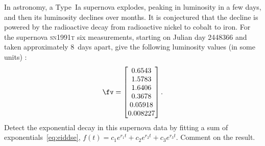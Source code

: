 \begin{exercise}  
In astronomy, a Type~Ia supernova explodes, peaking in luminosity in a few days, and then its luminosity declines over months. 
It is conjectured that the decline is powered by the radioactive decay from radioactive nickel to cobalt to iron.
For the supernova \textsc{sn1991t} six measurements, starting on Julian day 2448366 and taken approximately 8~days apart, give the following luminosity values (in some units) \cite[p.146]{Pereyra2010}:
\setbox\ajrqrbox\hbox{}\marginajrbox%
\begin{equation*}
\fv=\begin{bmatrix} 0.6543
\\ 1.5783
\\ 1.6406
\\ 0.3678
\\ 0.05918
\\ 0.008227 \end{bmatrix}.
\end{equation*}
Detect the exponential decay in this supernova data by fitting a sum of exponentials~\eqref{eq:eiddse}, \(f(t)=c_1e^{r_1t}+c_2e^{r_2t}+c_3e^{r_3t}\).
Comment on the result.
\end{exercise}




